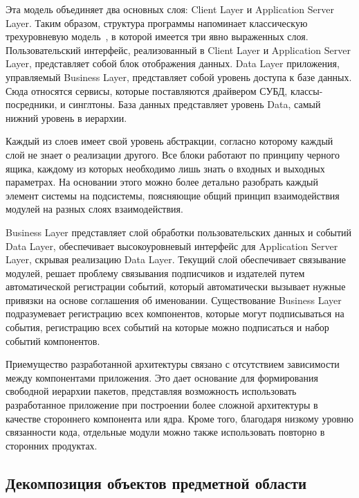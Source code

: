 Эта модель объединяет два основных слоя: Client Layer и \foreignlanguage{english}{Application Server Layer}. Таким образом, структура программы напоминает классическую трехуровневую модель~\cite[с.~308\,--\,401]{sicp_2006_ru}, в которой имеется три явно выраженных слоя. Пользовательский интерфейс, реализованный в Client Layer и \foreignlanguage{english}{Application Server Layer}, представляет собой блок отображения данных. Data Layer приложения, управляемый Business Layer, представляет собой уровень доступа к базе данных. Сюда относятся сервисы, которые поставляются драйвером СУБД, классы-посредники, и синглтоны. База данных представляет уровень Data, самый нижний уровень в иерархии.

Каждый из слоев имеет свой уровень абстракции, согласно которому каждый слой не знает о реализации другого. Все блоки работают по принципу черного ящика, каждому из которых необходимо лишь знать о входных и выходных параметрах. На основании этого можно более детально разобрать каждый элемент системы на подсистемы, поясняющие общий принцип взаимодействия модулей на разных слоях взаимодействия.

Business Layer представляет слой обработки пользовательских данных и событий Data Layer, обеспечивает высокоуровневый интерфейс для \foreignlanguage{english}{Application Server Layer}, скрывая реализацию Data Layer. Текущий слой обеспечивает связывание модулей, решает проблему связывания подписчиков и издателей путем автоматической регистрации событий, который автоматически вызывает нужные привязки на основе соглашения об именовании.
Существование Business Layer подразумевает регистрацию всех компонентов, которые могут подписываться на события, регистрацию всех событий на которые можно подписаться и набор событий компонентов.

Приемущество разработанной архитектуры связано с отсутствием зависимости между компонентами приложения. Это дает основание для формирования свободной иерархии пакетов, представляя возможность использовать разработанное приложение при построении более сложной архитектуры в качестве стороннего компонента или ядра. Кроме того, благодаря низкому уровню связанности кода, отдельные модули можно также использовать повторно в сторонних продуктах.

\subsection{Декомпозиция объектов предметной области}
\label{sub:domain:object_decomp}

